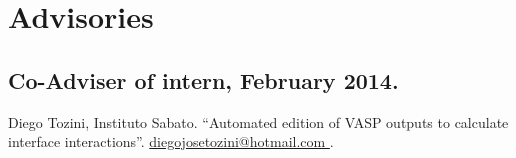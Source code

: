 \section{Advisories}

\subsection{Co-Adviser of intern, February 2014.} Diego Tozini, Instituto Sabato. “Automated edition
of VASP outputs to calculate interface interactions”. \url{diegojosetozini@hotmail.com
}.

